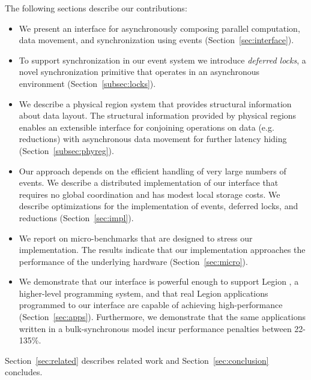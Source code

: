 The following sections describe our contributions:
\begin{itemize} \itemsep1pt \parskip0pt 
\item We present an interface for asynchronously composing
parallel computation, data movement, and synchronization using events (Section~\ref{sec:interface}).  

\item To support synchronization in our event system we introduce {\em deferred locks}, 
a novel synchronization primitive that operates in an asynchronous environment (Section~\ref{subsec:locks}).

\item We describe a physical region system that provides structural information about
data layout.  The structural information provided by physical regions enables an extensible
interface for conjoining operations on data (e.g. reductions) with asynchronous data movement for 
further latency hiding (Section~\ref{subsec:phyreg}).

\item Our approach depends on the efficient handling of very large numbers of events.
We describe a distributed implementation of our interface that requires no global coordination
and has modest local storage costs.  We describe optimizations for the implementation of events, 
deferred locks, and reductions (Section~\ref{sec:impl}).

\item We report on micro-benchmarks that are designed to stress
our implementation.  The results indicate that our implementation approaches the performance of
the underlying hardware (Section~\ref{sec:micro}).

\item We demonstrate that our interface is powerful enough to support Legion \cite{Legion12}, a higher-level
programming system, and that real Legion applications programmed to our interface
are capable of achieving high-performance (Section~\ref{sec:apps}).  Furthermore, we demonstrate
that the same applications written in a bulk-synchronous model incur performance penalties between 22-135\%.
\end{itemize}

Section~\ref{sec:related} describes related work and Section~\ref{sec:conclusion}
concludes.

